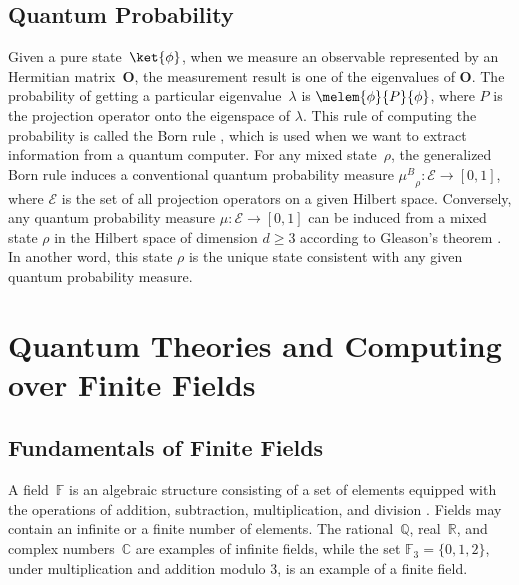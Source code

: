 \documentclass[twoside]{iuphd}
\newcommand{\muB}{\ensuremath{\mu^{B}}}
\newcommand{\events}{\ensuremath{\mathcal{E}}}
\begin{document}
\section{Quantum Probability}

Given a pure state~$\ket{\phi}$, when we measure an observable represented
by an Hermitian matrix~$\mathbf{O}$, the measurement result is one
of the eigenvalues of $\mathbf{O}$. The probability of getting a
particular eigenvalue~$\lambda$ is $\melem{\phi}{P}{\phi}$, where
$P$ is the projection operator onto the eigenspace of $\lambda$.
This rule of computing the probability is called the Born rule \cite{Born1983,Mermin2007,Jaeger2007},
which is used when we want to extract information from a quantum computer.
For any mixed state~$\rho$, the generalized Born rule induces a
conventional quantum probability measure $\muB_{\rho}:\events\rightarrow[0,1]$,
where $\events$ is the set of all projection operators on a given
Hilbert space. Conversely, any quantum probability measure $\mu:\events\rightarrow[0,1]$
can be induced from a mixed state $\rho$ in the Hilbert space of
dimension $d\ge3$ according to Gleason's theorem \cite{gleason1957,Redhead1987-REDINA,peres1995quantum,RichmanBridges1999,Hamhalter2013}.
In another word, this state $\rho$ is the unique state consistent
with any given quantum probability measure.

\chapter{Quantum Theories and Computing over Finite Fields}

\section{Fundamentals of Finite Fields\label{sec:background}}

A field~$\mathbb{F}$ is an algebraic structure consisting of a set
of elements equipped with the operations of addition, subtraction,
multiplication, and division \cite{fieldtheory.ref,numtheory.ref}.
Fields may contain an infinite or a finite number of elements. The
rational~$\mathbb{Q}$, real~$\mathbb{R}$, and complex numbers~$\mathbb{C}$
are examples of infinite fields, while the set $\mathbb{F}_{3}=\{0,1,2\}$,
under multiplication and addition modulo $3$, is an example of a
finite field.
\end{document}
